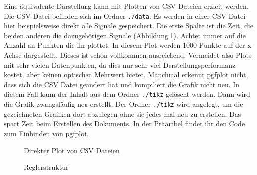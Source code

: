 \documentclass[a4paper, 12pt]{article}
\begin{document}
Eine äquivalente Darstellung kann mit Plotten von CSV Dateien erzielt werden. Die CSV Datei befinden sich im Ordner \verb|./data|. Es werden in einer CSV Datei hier beispielsweise direkt alle Signale gespeichert. Die erste Spalte ist die Zeit, die beiden anderen die dazugehörigen Signale (Abbildung \ref{fig:csv_plot}). Achtet immer auf die Anzahl an Punkten die ihr plottet. In diesem Plot werden 1000 Punkte auf der x-Achse dargestellt. Dieses ist schon vollkommen ausreichend. Vermeidet also Plots mit sehr vielen Datenpunkten, da dies nur sehr viel Darstellungsperformanz kostet, aber keinen optischen Mehrwert bietet. Manchmal erkennt pgfplot nicht, dass sich die CSV Datei geändert hat und kompiliert die Grafik nicht neu. In diesem Fall kann der Inhalt aus dem Ordner \verb|./tikz| gelöscht werden. Dann wird die Grafik zwangsläufig neu erstellt. Der Ordner \verb|./tikz| wird angelegt, um die gezeichneten Grafiken dort abzulegen ohne sie jedes mal neu zu erstellen. Das spart Zeit beim Erstellen des Dokuments. In der Präambel \verb|| findet ihr den Code zum Einbinden von pgfplot.

\begin{figure}[ht]
	\centering
	\caption{Direkter Plot von CSV Dateien}
	\label{fig:csv_plot}
\end{figure}

\begin{figure}[ht]
    \centering
    \caption{Reglerstruktur}
    \label{fig:controlsystem}
\end{figure}
\end{document}
